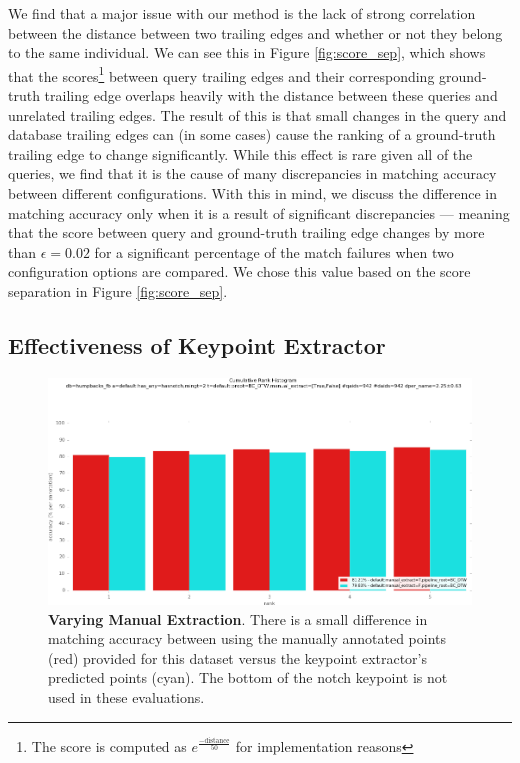 We find that a major issue with our method is the lack of strong correlation between the distance between two trailing edges and whether or not they belong to the same individual.
We can see this in Figure \ref{fig:score_sep}, which shows that the scores\footnote{The score is computed as $e^{\frac{-\text{distance}}{50}}$ for implementation reasons} between query trailing edges and their corresponding ground-truth trailing edge overlaps heavily with the distance between these queries and unrelated trailing edges.
The result of this is that small changes in the query and database trailing edges can (in some cases) cause the ranking of a ground-truth trailing edge to change significantly.
While this effect is rare given all of the queries, we find that it is the cause of many discrepancies in matching accuracy between different configurations.
With this in mind, we discuss the difference in matching accuracy only when it is a result of significant discrepancies --- meaning that the score between query and ground-truth trailing edge changes by more than $\epsilon = 0.02$ for a significant percentage of the match failures when two configuration options are compared.
We chose this value based on the score separation in Figure \ref{fig:score_sep}. 

\subsection{Effectiveness of Keypoint Extractor}
\begin{figure}[t]%
\centering
\includegraphics[width=1\textwidth]{../images/results/vary_manual_extract.png}
\caption{\textbf{Varying Manual Extraction}. There is a small difference in matching accuracy between using the manually annotated points (red) provided for this dataset versus the keypoint extractor's predicted points (cyan). The bottom of the notch keypoint is not used in these evaluations.}
\label{fig:vary_manual_extract}
\end{figure}

